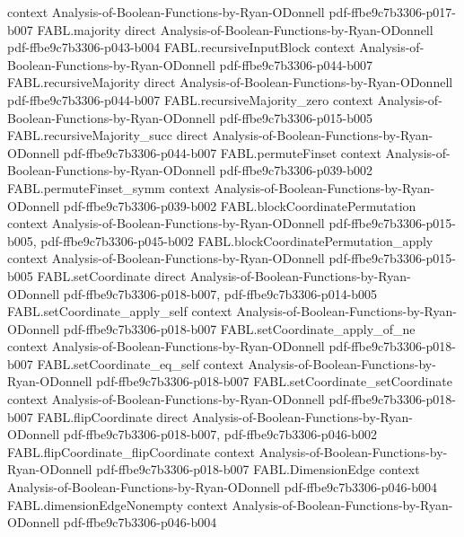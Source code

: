 \begin{theorem}
  {context}
  {Analysis-of-Boolean-Functions-by-Ryan-ODonnell}
  {pdf-ffbe9c7b3306-p017-b007}
\proofstep
  {FABL.majority}
  {direct}
  {Analysis-of-Boolean-Functions-by-Ryan-ODonnell}
  {pdf-ffbe9c7b3306-p043-b004}
\proofstep
  {FABL.recursiveInputBlock}
  {context}
  {Analysis-of-Boolean-Functions-by-Ryan-ODonnell}
  {pdf-ffbe9c7b3306-p044-b007}
\proofstep
  {FABL.recursiveMajority}
  {direct}
  {Analysis-of-Boolean-Functions-by-Ryan-ODonnell}
  {pdf-ffbe9c7b3306-p044-b007}
\proofstep
  {FABL.recursiveMajority_zero}
  {context}
  {Analysis-of-Boolean-Functions-by-Ryan-ODonnell}
  {pdf-ffbe9c7b3306-p015-b005}
\proofstep
  {FABL.recursiveMajority_succ}
  {direct}
  {Analysis-of-Boolean-Functions-by-Ryan-ODonnell}
  {pdf-ffbe9c7b3306-p044-b007}
\proofstep
  {FABL.permuteFinset}
  {context}
  {Analysis-of-Boolean-Functions-by-Ryan-ODonnell}
  {pdf-ffbe9c7b3306-p039-b002}
\proofstep
  {FABL.permuteFinset_symm}
  {context}
  {Analysis-of-Boolean-Functions-by-Ryan-ODonnell}
  {pdf-ffbe9c7b3306-p039-b002}
\proofstep
  {FABL.blockCoordinatePermutation}
  {context}
  {Analysis-of-Boolean-Functions-by-Ryan-ODonnell}
  {pdf-ffbe9c7b3306-p015-b005,
    pdf-ffbe9c7b3306-p045-b002}
\proofstep
  {FABL.blockCoordinatePermutation_apply}
  {context}
  {Analysis-of-Boolean-Functions-by-Ryan-ODonnell}
  {pdf-ffbe9c7b3306-p015-b005}
\proofstep
  {FABL.setCoordinate}
  {direct}
  {Analysis-of-Boolean-Functions-by-Ryan-ODonnell}
  {pdf-ffbe9c7b3306-p018-b007,
    pdf-ffbe9c7b3306-p014-b005}
\proofstep
  {FABL.setCoordinate_apply_self}
  {context}
  {Analysis-of-Boolean-Functions-by-Ryan-ODonnell}
  {pdf-ffbe9c7b3306-p018-b007}
\proofstep
  {FABL.setCoordinate_apply_of_ne}
  {context}
  {Analysis-of-Boolean-Functions-by-Ryan-ODonnell}
  {pdf-ffbe9c7b3306-p018-b007}
\proofstep
  {FABL.setCoordinate_eq_self}
  {context}
  {Analysis-of-Boolean-Functions-by-Ryan-ODonnell}
  {pdf-ffbe9c7b3306-p018-b007}
\proofstep
  {FABL.setCoordinate_setCoordinate}
  {context}
  {Analysis-of-Boolean-Functions-by-Ryan-ODonnell}
  {pdf-ffbe9c7b3306-p018-b007}
\proofstep
  {FABL.flipCoordinate}
  {direct}
  {Analysis-of-Boolean-Functions-by-Ryan-ODonnell}
  {pdf-ffbe9c7b3306-p018-b007,
    pdf-ffbe9c7b3306-p046-b002}
\proofstep
  {FABL.flipCoordinate_flipCoordinate}
  {context}
  {Analysis-of-Boolean-Functions-by-Ryan-ODonnell}
  {pdf-ffbe9c7b3306-p018-b007}
\proofstep
  {FABL.DimensionEdge}
  {context}
  {Analysis-of-Boolean-Functions-by-Ryan-ODonnell}
  {pdf-ffbe9c7b3306-p046-b004}
\proofstep
  {FABL.dimensionEdgeNonempty}
  {context}
  {Analysis-of-Boolean-Functions-by-Ryan-ODonnell}
  {pdf-ffbe9c7b3306-p046-b004}

\end{theorem}
